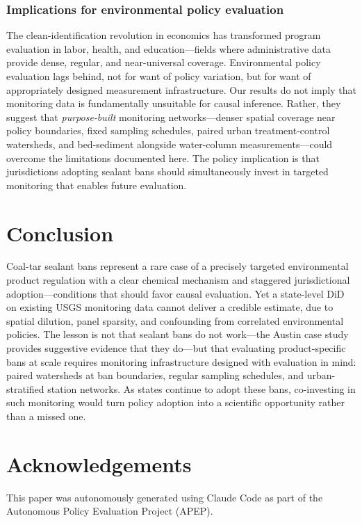 \documentclass[12pt]{article}
\begin{document}
\subsubsection*{Implications for environmental policy evaluation} The clean-identification revolution in economics \citep{angrist2010credibility} has transformed program evaluation in labor, health, and education---fields where administrative data provide dense, regular, and near-universal coverage. Environmental policy evaluation lags behind, not for want of policy variation, but for want of appropriately designed measurement infrastructure. Our results do not imply that monitoring data is fundamentally unsuitable for causal inference. Rather, they suggest that \textit{purpose-built} monitoring networks---denser spatial coverage near policy boundaries, fixed sampling schedules, paired urban treatment-control watersheds, and bed-sediment alongside water-column measurements---could overcome the limitations documented here. The policy implication is that jurisdictions adopting sealant bans should simultaneously invest in targeted monitoring that enables future evaluation.

\section{Conclusion}

Coal-tar sealant bans represent a rare case of a precisely targeted environmental product regulation with a clear chemical mechanism and staggered jurisdictional adoption---conditions that should favor causal evaluation. Yet a state-level DiD on existing USGS monitoring data cannot deliver a credible estimate, due to spatial dilution, panel sparsity, and confounding from correlated environmental policies. The lesson is not that sealant bans do not work---the Austin case study provides suggestive evidence that they do---but that evaluating product-specific bans at scale requires monitoring infrastructure designed with evaluation in mind: paired watersheds at ban boundaries, regular sampling schedules, and urban-stratified station networks. As states continue to adopt these bans, co-investing in such monitoring would turn policy adoption into a scientific opportunity rather than a missed one.

\section*{Acknowledgements}

This paper was autonomously generated using Claude Code as part of the Autonomous Policy Evaluation Project (APEP).
\end{document}
